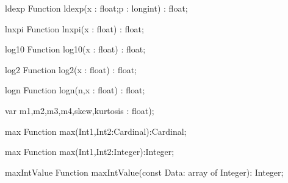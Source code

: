\FPCexample{}


\begin{function}{ldexp}
\Declaration
Function ldexp(x : float;p : longint) : float;
\Description

\Errors
\SeeAlso
\end{function}

\FPCexample{}


\begin{function}{lnxpi}
\Declaration
Function lnxpi(x : float) : float;
\Description

\Errors
\SeeAlso
\end{function}

\FPCexample{}


\begin{function}{log10}
\Declaration
Function log10(x : float) : float;
\Description

\Errors
\SeeAlso
\end{function}

\FPCexample{}


\begin{function}{log2}
\Declaration
Function log2(x : float) : float;
\Description

\Errors
\SeeAlso
\end{function}

\FPCexample{}


\begin{function}{logn}
\Declaration
Function logn(n,x : float) : float;
\Description

\Errors
\SeeAlso
\end{function}

\FPCexample{}


  var m1,m2,m3,m4,skew,kurtosis : float);
\begin{function}{max}
\Declaration
Function max(Int1,Int2:Cardinal):Cardinal;
\Description

\Errors
\SeeAlso
\end{function}

\FPCexample{}


\begin{function}{max}
\Declaration
Function max(Int1,Int2:Integer):Integer;
\Description

\Errors
\SeeAlso
\end{function}

\FPCexample{}


\begin{function}{maxIntValue}
\Declaration
Function maxIntValue(const Data: array of Integer): Integer;
\Description

\Errors
\SeeAlso
\end{function}

